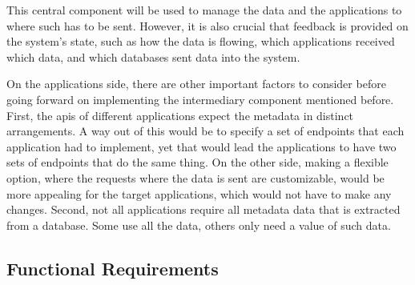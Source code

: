 This central component will be used to manage the data and the applications to where such has to be sent.
However, it is also crucial that feedback is provided on the system's state, such as how the data is flowing, which applications received which data, and which databases sent data into the system.


On the applications side, there are other important factors to consider before going forward on implementing the intermediary component mentioned before.
First, the \gls{api}s of different applications expect the metadata in distinct arrangements.
A way out of this would be to specify a set of endpoints that each application had to implement, yet that would lead the applications to have two sets of endpoints that do the same thing.
On the other side, making a flexible option, where the requests where the data is sent are customizable, would be more appealing for the target applications, which would not have to make any changes.
Second, not all applications require all metadata data that is extracted from a database.
Some use all the data, others only need a value of such data.

\subsection{Functional Requirements}

